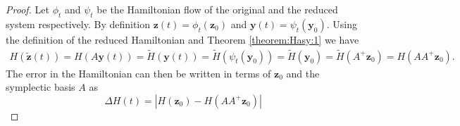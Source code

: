 \documentclass[final]{siamart}
\begin{document}
\begin{proof}
	Let $\phi_t$ and $\psi_t$ be the Hamiltonian flow of the original and the reduced system respectively. By definition $\mathbf z(t) = \phi_t(\mathbf z_0)$ and $\mathbf y(t) = \psi_t(\mathbf y_0)$. Using the definition of the reduced Hamiltonian and Theorem \ref{theorem:Hasy:1} we have
\begin{equation} \label{eq:SyMo:6}
\begin{aligned}
	H(\tilde{\mathbf{z}} (t)) = H( A\mathbf y (t) ) = \tilde H(\mathbf y (t)) = \tilde H(\psi_t(\mathbf y_0)) = \tilde H(\mathbf y_0) = \tilde H(A^+ \mathbf z_0) = H(AA^+\mathbf z_0).
\end{aligned}
\end{equation}
The error in the Hamiltonian can then be written in terms of $\mathbf z_0$ and the symplectic basis $A$ as
\begin{equation} \label{eq:SyMo:7}
	\Delta H(t) = |H(\mathbf z_0) - H(AA^+\mathbf z_0)|
\end{equation}
\end{proof}
\end{document}
